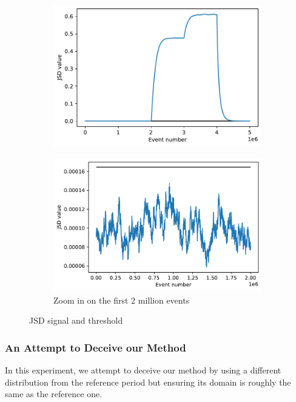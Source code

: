 \begin{figure}[!htb]
\centering
\begin{subfigure}{.5\textwidth}
  \centering
  \includegraphics[width=1\linewidth]{figures/stream-analysis-viz-test04.pdf}
  \label{fig:JSD-signal-test04}
\end{subfigure}%
\begin{subfigure}{.5\textwidth}
  \centering
  \includegraphics[width=1\linewidth]{figures/stream-analysis-viz-zoom-test04.pdf}
  \caption{Zoom in on the first 2 million events}
  \label{fig:JSD-signal-zoom-test04}
\end{subfigure}
\caption{JSD signal and threshold}
\end{figure}


\subsubsection{An Attempt to Deceive our Method}
In this experiment, we attempt to deceive our method by using a different distribution from the reference period but ensuring its domain is roughly the same as the reference one.

